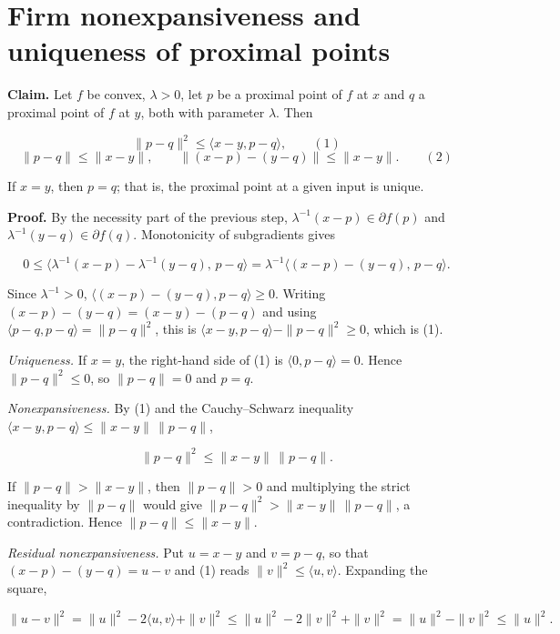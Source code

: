 \documentclass[11pt,a4paper]{article}
\begin{document}
\section{\texorpdfstring{Firm nonexpansiveness and uniqueness of proximal points}{Firm nonexpansiveness and uniqueness of proximal points}}


\textbf{Claim.} Let \(f\) be convex, \(\lambda>0\), let \(p\) be a proximal point of \(f\) at \(x\) and \(q\) a proximal point of \(f\) at \(y\), both with parameter \(\lambda\). Then


\[\|p-q\|^2\le\langle x-y,p-q\rangle,\qquad(1)\]
\[\|p-q\|\le\|x-y\|,\qquad\|(x-p)-(y-q)\|\le\|x-y\|.\qquad(2)\]


If \(x=y\), then \(p=q\); that is, the proximal point at a given input is unique.




\textbf{Proof.} By the necessity part of the previous step, \(\lambda^{-1}(x-p)\in\partial f(p)\) and \(\lambda^{-1}(y-q)\in\partial f(q)\). Monotonicity of subgradients gives


\[0\le\bigl\langle\lambda^{-1}(x-p)-\lambda^{-1}(y-q),\,p-q\bigr\rangle=\lambda^{-1}\bigl\langle(x-p)-(y-q),\,p-q\bigr\rangle.\]


Since \(\lambda^{-1}>0\), \(\langle(x-p)-(y-q),p-q\rangle\ge0\). Writing \((x-p)-(y-q)=(x-y)-(p-q)\) and using \(\langle p-q,p-q\rangle=\|p-q\|^2\), this is \(\langle x-y,p-q\rangle-\|p-q\|^2\ge0\), which is (1).




\emph{Uniqueness.} If \(x=y\), the right-hand side of (1) is \(\langle0,p-q\rangle=0\). Hence \(\|p-q\|^2\le0\), so \(\|p-q\|=0\) and \(p=q\).




\emph{Nonexpansiveness.} By (1) and the Cauchy–Schwarz inequality \(\langle x-y,p-q\rangle\le\|x-y\|\,\|p-q\|\),


\[\|p-q\|^2\le\|x-y\|\,\|p-q\|.\]


If \(\|p-q\|>\|x-y\|\), then \(\|p-q\|>0\) and multiplying the strict inequality by \(\|p-q\|\) would give \(\|p-q\|^2>\|x-y\|\,\|p-q\|\), a contradiction. Hence \(\|p-q\|\le\|x-y\|\).




\emph{Residual nonexpansiveness.} Put \(u=x-y\) and \(v=p-q\), so that \((x-p)-(y-q)=u-v\) and (1) reads \(\|v\|^2\le\langle u,v\rangle\). Expanding the square,


\[\|u-v\|^2=\|u\|^2-2\langle u,v\rangle+\|v\|^2\le\|u\|^2-2\|v\|^2+\|v\|^2=\|u\|^2-\|v\|^2\le\|u\|^2.\]
\end{document}
